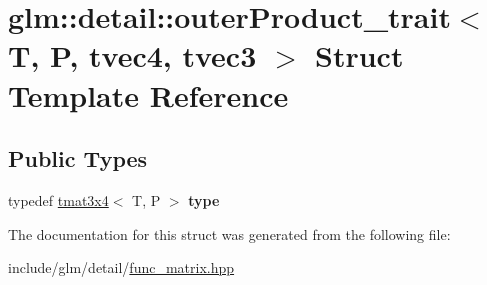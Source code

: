 \hypertarget{structglm_1_1detail_1_1outerProduct__trait_3_01T_00_01P_00_01tvec4_00_01tvec3_01_4}{}\section{glm\+:\+:detail\+:\+:outer\+Product\+\_\+trait$<$ T, P, tvec4, tvec3 $>$ Struct Template Reference}
\label{structglm_1_1detail_1_1outerProduct__trait_3_01T_00_01P_00_01tvec4_00_01tvec3_01_4}
\subsection*{Public Types}
\begin{DoxyCompactItemize}
\item 
\mbox{\label{structglm_1_1detail_1_1outerProduct__trait_3_01T_00_01P_00_01tvec4_00_01tvec3_01_4_a1e1df085b79e67665ed53cb59d80af07}} 
typedef \hyperlink{structglm_1_1tmat3x4}{tmat3x4}$<$ T, P $>$ {\bfseries type}
\end{DoxyCompactItemize}


The documentation for this struct was generated from the following file\+:\begin{DoxyCompactItemize}
\item 
include/glm/detail/\hyperlink{func__matrix_8hpp}{func\+\_\+matrix.\+hpp}\end{DoxyCompactItemize}
